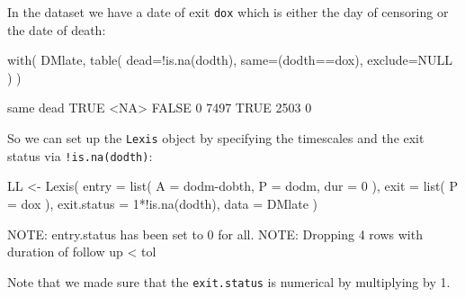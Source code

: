 \begin{enumerate}
  In the dataset we have a date of exit \texttt{dox} which is either
  the day of censoring or the date of death:
\begin{Schunk}
\begin{Sinput}
 with( DMlate, table( dead=!is.na(dodth),
                      same=(dodth==dox), exclude=NULL ) )
\end{Sinput}
\begin{Soutput}
       same
dead    TRUE <NA>
  FALSE    0 7497
  TRUE  2503    0
\end{Soutput}
\end{Schunk}
  So we can set up the \texttt{Lexis} object by specifying the
  timescales and the exit status via \texttt{!is.na(dodth)}:
\begin{Schunk}
\begin{Sinput}
 LL <- Lexis( entry = list( A = dodm-dobth,
                            P = dodm,
                          dur = 0 ),
               exit = list( P = dox ),
        exit.status = 1*!is.na(dodth),
               data = DMlate )
\end{Sinput}
\begin{Soutput}
NOTE: entry.status has been set to 0 for all.
NOTE: Dropping  4  rows with duration of follow up < tol
\end{Soutput}
\end{Schunk}
Note that we made sure that the \texttt{exit.status} is numerical by
multiplying by 1.


\end{enumerate}
